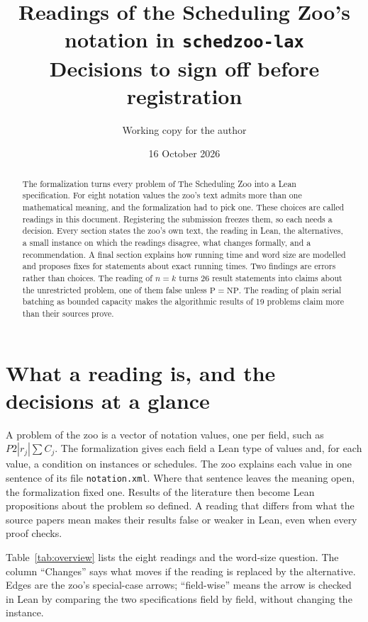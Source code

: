 \documentclass[11pt]{article}
\title{Readings of the Scheduling Zoo's notation in \texttt{schedzoo-lax}\\[2pt]
\large Decisions to sign off before registration}
\author{Working copy for the author}
\date{16 October 2026}
\theoremstyle{definition}
\begin{document}
\maketitle

\begin{abstract}
The formalization turns every problem of The Scheduling Zoo into a Lean
specification. For eight notation values the zoo's text admits more than one
mathematical meaning, and the formalization had to pick one. These choices
are called readings in this document. Registering the submission freezes them, so
each needs a decision. Every section states the zoo's own text, the reading
in Lean, the alternatives, a small instance on which the readings disagree,
what changes formally, and a recommendation. A final section explains how
running time and word size are modelled and proposes fixes for statements
about exact running times. Two findings are errors rather than choices. The
reading of $n=k$ turns 26 result statements into claims about the
unrestricted problem, one of them false unless $\mathrm{P}=\mathrm{NP}$. The
reading of plain serial batching as bounded capacity makes the algorithmic
results of 19 problems claim more than their sources prove.
\end{abstract}

\section{What a reading is, and the decisions at a glance}

A problem of the zoo is a vector of notation values, one per field, such as
$P2|r_j|\sum C_j$. The formalization gives each field a Lean type of values and,
for each value, a condition on instances or schedules. The zoo explains each
value in one sentence of its file \texttt{notation.xml}. Where that sentence
leaves the meaning open, the formalization fixed one. Results of the
literature then become Lean propositions about the problem so defined. A
reading that differs from what the source papers mean makes their results
false or weaker in Lean, even when every proof checks.

Table~\ref{tab:overview} lists the eight readings and the word-size
question. The column ``Changes'' says what moves if the reading is replaced
by the alternative. Edges are the zoo's special-case arrows; ``field-wise''
means the arrow is checked in Lean by comparing the two specifications field
by field, without changing the instance.
\end{document}
